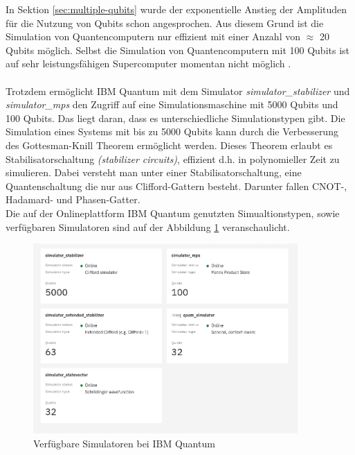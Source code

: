 In Sektion \ref{sec:multiple-qubits} wurde der exponentielle Anstieg der Amplituden f\"ur die Nutzung von Qubits schon angesprochen. Aus diesem Grund ist die Simulation von Quantencomputern nur effizient mit einer Anzahl von $\approx$ 20 Qubits m\"oglich. Selbst die Simulation von Quantencomputern mit 100 Qubits ist auf sehr leistungsf\"ahigen Supercomputer momentan nicht m\"oglich \cite{Qiskit-Textbook}. \\\\
Trotzdem erm\"oglicht IBM Quantum mit dem Simulator \textit{simulator_stabilizer} und \textit{simulator_mps} den Zugriff auf eine Simulationsmaschine mit 5000 Qubits und 100 Qubits. Das liegt daran, dass es unterschiedliche Simulationstypen gibt. Die Simulation eines Systems mit bis zu 5000 Qubits kann durch die Verbesserung des Gottesman-Knill Theorem \cite{Aaronson_2004} erm\"oglicht werden. Dieses Theorem erlaubt es Stabilisatorschaltung \textit{(stabilizer circuits)}, effizient d.h. in polynomieller Zeit zu simulieren. Dabei versteht man unter einer Stabilisatorschaltung, eine Quantenschaltung die nur aus Clifford-Gattern besteht. Darunter fallen CNOT-, Hadamard- und Phasen-Gatter. \\
Die auf der Onlineplattform IBM Quantum genutzten Simualtionstypen, sowie verf\"ugbaren Simulatoren sind auf der Abbildung \ref{fig:simulated-services} veranschaulicht. 
\begin{figure}
\centering
\includegraphics[width=0.9\textwidth]{figures/simulation_services.png}
\caption{Verf\"ugbare Simulatoren bei IBM Quantum}
\label{fig:simulated-services}
\end{figure}
